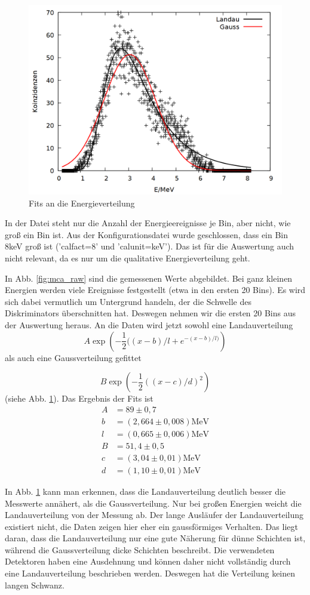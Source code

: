 \begin{figure}
\centering
\includegraphics[width=0.75\linewidth]{data/friedrich/mca.png}
\caption{Fits an die Energieverteilung}
\label{fig:mca}
\end{figure}

In der Datei steht nur die Anzahl der Energieereignisse je Bin, aber nicht, wie groß ein Bin ist. Aus der Konfigurationsdatei wurde geschlossen, dass ein Bin 8keV groß ist ('calfact=8' und 'calunit=keV'). Das ist für die Auswertung auch nicht relevant, da es nur um die qualitative Energieverteilung geht.  

In Abb. \ref{fig:mca_raw} sind die gemessenen Werte abgebildet. Bei ganz kleinen Energien werden viele Ereignisse festgestellt (etwa in den ersten 20 Bins). Es wird sich dabei vermutlich um Untergrund handeln, der die Schwelle des Diskriminators überschnitten hat. Deswegen nehmen wir die ersten 20 Bins aus der Auswertung heraus. An die Daten wird jetzt sowohl eine Landauverteilung
\[A\exp{\left(-\frac{1}{2}((x-b)/l + e^{-(x-b)/l)}\right)}\] als auch eine Gaussverteilung gefittet

\[B\exp{\left(-\frac{1}{2}((x-c)/d)^2 \right)}\]
 (siehe Abb. \ref{fig:mca}). Das Ergebnis der Fits ist
 \begin{align}
 A &= 89 \pm 0,7\\
 b &= (2,664 \pm 0,008)\si{\mega\eV}\\
 l &= (0,665  \pm 0,006)\si{\mega\eV}\\
 B &= 51,4 \pm 0,5\\
 c &= (3,04\pm 0,01)\si{\mega\eV}\\
 d &=( 1,10 \pm 0,01) \si{\mega\eV}
 \end{align}
 
In Abb. \ref{fig:mca} kann man erkennen, dass die Landauverteilung deutlich besser die Messwerte annähert, als die Gaussverteilung. Nur bei großen Energien weicht die Landauverteilung von der Messung ab. Der lange Ausläufer der Landauverteilung existiert nicht, die Daten zeigen hier eher ein gaussförmiges Verhalten. Das liegt daran, dass die Landauverteilung nur eine gute Näherung für dünne Schichten ist, während die Gaussverteilung dicke Schichten beschreibt. Die verwendeten Detektoren haben eine Ausdehnung und können daher nicht vollständig durch eine Landauverteilung beschrieben werden. Deswegen hat die Verteilung keinen langen Schwanz.\\

